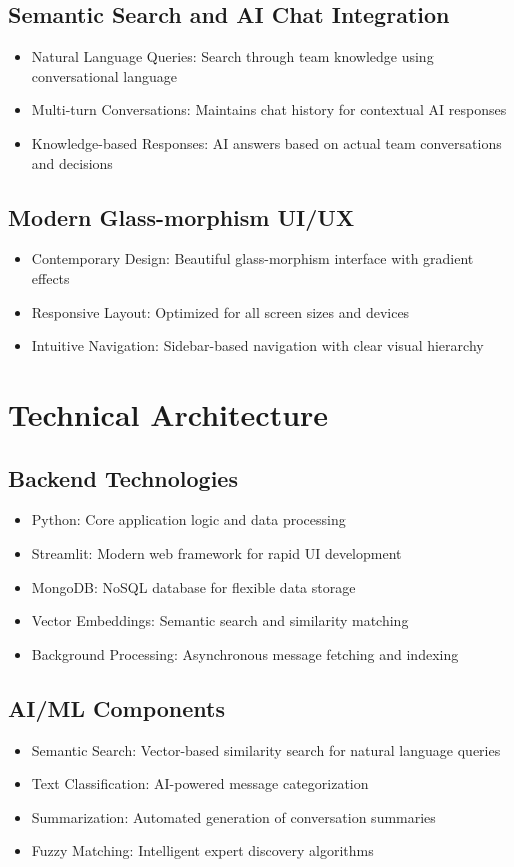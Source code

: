 \documentclass[12pt,a4paper]{article}
\begin{document}
\subsection{Semantic Search and AI Chat Integration}
\begin{itemize}
    \item Natural Language Queries: Search through team knowledge using conversational language
    \item Multi-turn Conversations: Maintains chat history for contextual AI responses
    \item Knowledge-based Responses: AI answers based on actual team conversations and decisions
\end{itemize}
\subsection{Modern Glass-morphism UI/UX}
\begin{itemize}
    \item Contemporary Design: Beautiful glass-morphism interface with gradient effects
    \item Responsive Layout: Optimized for all screen sizes and devices
    \item Intuitive Navigation: Sidebar-based navigation with clear visual hierarchy
\end{itemize}
\section{Technical Architecture}
\subsection{Backend Technologies}
\begin{itemize}
    \item Python: Core application logic and data processing
    \item Streamlit: Modern web framework for rapid UI development
    \item MongoDB: NoSQL database for flexible data storage
    \item Vector Embeddings: Semantic search and similarity matching
    \item Background Processing: Asynchronous message fetching and indexing
\end{itemize}
\subsection{AI/ML Components}
\begin{itemize}
    \item Semantic Search: Vector-based similarity search for natural language queries
    \item Text Classification: AI-powered message categorization
    \item Summarization: Automated generation of conversation summaries
    \item Fuzzy Matching: Intelligent expert discovery algorithms
\end{itemize}
\end{document}
